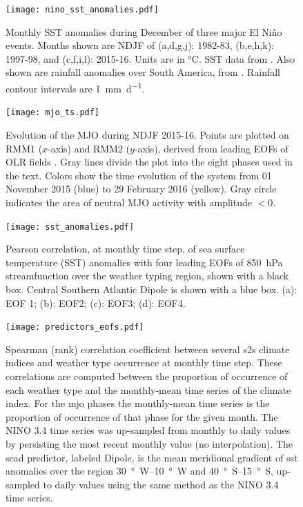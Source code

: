 \documentclass{article}
\begin{document}
\begin{figure}
	\texttt{[image: nino\_sst\_anomalies.pdf]}
	\caption{
		Monthly SST anomalies during December of three major El Ni\~{n}o events.
		Months shown are NDJF of (a,d,g,j): 1982-83, (b,e,h,k): 1997-98, and (c,f,i,l): 2015-16.
		Units are in \si{\celsius}.
		SST data from \citet{Reynolds2002}.
		Also shown are rainfall anomalies over South America, from \citet{Chen2008}.
		Rainfall contour intervals are \SI{1}{\milli\meter\per\day}.
	}
\end{figure}

\begin{figure}
	\texttt{[image: mjo\_ts.pdf]}
	\caption{
		Evolution of the MJO during NDJF 2015-16.
		Points are plotted on RMM1 ($x$-axis) and RMM2 ($y$-axis), derived from leading EOFs of OLR fields \citep{Wheeler2004}.
		Gray lines divide the plot into the eight phases used in the text.
		Colors show the time evolution of the system from 01 November 2015 (blue) to 29 February 2016 (yellow).
		Gray circle indicates the area of neutral MJO activity with amplitude $<0$.
	}
\end{figure}

\begin{figure}
	\noindent\texttt{[image: sst\_anomalies.pdf]}
	\caption{
		Pearson correlation, at monthly time step, of  sea surface temperature (SST) anomalies \citep{Reynolds2002} with four leading EOFs of \SI{850}{\hecto\pascal} streamfunction over the weather typing region, shown with a black box.
		Central Southern Atlantic Dipole is shown with a blue box.
		(a): EOF 1; (b): EOF2; (c): EOF3; (d): EOF4.
	}\label{fig:sst-anomalies}
\end{figure}

\begin{figure}
	\texttt{[image: predictors\_eofs.pdf]}
	\caption{
		Spearman (rank) correlation coefficient between several \gls{s2s} climate indices and weather type occurrence at monthly time step.
		These correlations are computed between the proportion of occurrence of each weather type and the monthly-mean time series of the climate index.
		For the \gls{mjo} phases the monthly-mean time series is the proportion of occurrence of that phase for the given month.
		The NINO 3.4 time series was up-sampled from monthly to daily values by persisting the most recent monthly value (no interpolation).
		The \acrfull{scad} predictor, labeled Dipole, is the mean meridional gradient of \gls{sst} anomalies over the region \SIrange{30}{10}{\degree W} and \SIrange{40}{15}{\degree S}, up-sampled to daily values using the same method as the NINO 3.4 time series.
	}\label{fig:predictor-eof}
\end{figure}

\clearpage


\end{document}
